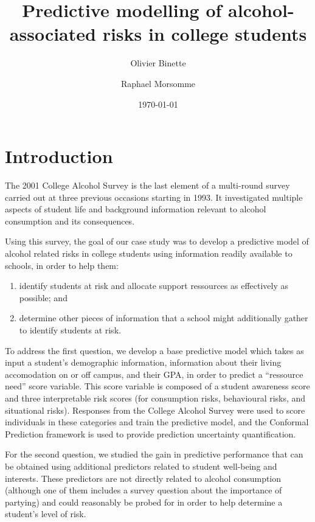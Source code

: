\documentclass[10pt]{amsart}%
\title{Predictive modelling of alcohol-associated risks in college students}
\author{Olivier Binette \and Raphael Morsomme}
\date{\today} %
\begin{document}
\maketitle

\section{Introduction}
\label{sec:intro}

The 2001 College Alcohol Survey is the last element of a multi-round survey carried out at three previous occasions starting in 1993. It investigated multiple aspects of student life and background information relevant to alcohol consumption and its consequences. 

Using this survey, the goal of our case study was to develop a predictive model of alcohol related risks in college students using information readily available to schools, in order to help them:
\begin{enumerate}
  \item identify students at risk and allocate support ressources as effectively as possible; and
  \item determine other pieces of information that a school might additionally gather to identify students at risk.
\end{enumerate}
To address the first question, we develop a base predictive model which takes as input a student's demographic information, information about their living accomodation on or off campus, and their GPA, in order to predict a ``ressource need'' score variable. This score variable is composed of a student awareness score and three interpretable risk scores (for consumption risks, behavioural risks, and situational risks). Responses from the College Alcohol Survey were used to score individuals in these categories and train the predictive model, and the Conformal Prediction framework \cite{Vovk.2005} is used to provide prediction uncertainty quantification.

For the second question, we studied the gain in predictive performance that can be obtained using additional predictors related to student well-being and interests. These predictors are not directly related to alcohol consumption (although one of them includes a survey question about the importance of partying) and could reasonably be probed for in order to help determine a student's level of risk. 
\end{document}
